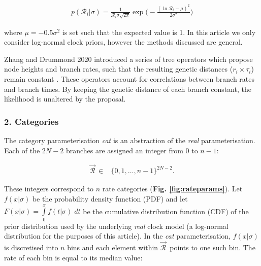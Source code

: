 \documentclass[10pt,letterpaper]{article}
\begin{document}
\begin{align}
p(\mathcal{R}_i | \sigma) = \frac{1}{\mathcal{R}_i \sigma \sqrt{2\pi}} \exp \big( -\frac{(\ln \mathcal{R}_i - \mu)^2}{2\sigma^2} \big) 
\end{align}


\noindent
where $\mu = -0.5\sigma^2$ is set such that the expected value is 1.
In this article we only consider log-normal clock priors, however the methods discussed are general.


Zhang and Drummond 2020 introduced a series of tree operators which propose node heights and branch rates, such that the resulting genetic distances ($r_i \times \tau_i$) remain constant \cite{zhang2020improving}. 
These operators account for correlations between branch rates and branch times.
By keeping the genetic distance of each branch constant, the likelihood is unaltered by the proposal. 







\subsubsection*{2. Categories}
The category parameterisation \textit{cat} is an abstraction of the \textit{real} parameterisation. 
Each of the $2N-2$ branches are assigned an integer from $0$ to $n-1$:

\begin{align}
\vec{\mathcal{R}}^{\,} \in& \{ 0, 1, \dotso, n-1 \}^{2N-2}.
\end{align}


These integers correspond to $n$ rate categories (\textbf{Fig. \ref{fig:rateparams}}).
Let $f(x|\sigma)$ be the probability density function (PDF) and let $F(x|\sigma) = \int\limits_{0}^{x} f(t|\sigma) \; dt$ be the cumulative distribution function (CDF) of the prior distribution used by the underlying \textit{real} clock model (a log-normal distribution for the purposes of this article). 
In the \textit{cat} parameterisation, $f(x|\sigma)$ is discretised into $n$ bins and each element within $\vec{\mathcal{R}}^{\,}$ points to one such bin.
The rate of each bin is equal to its median value:
\end{document}
